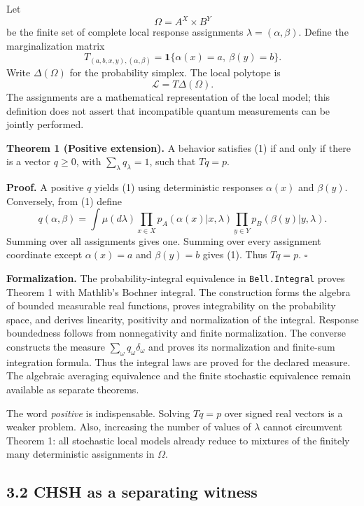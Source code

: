 \documentclass[
]{article}
\begin{document}
Let
\[
\Omega=A^X\times B^Y
\]
be the finite set of complete local response assignments \(\lambda=(\alpha,\beta)\). Define the marginalization matrix
\[
T_{(a,b,x,y),(\alpha,\beta)}
=\mathbf1\{\alpha(x)=a,\ \beta(y)=b\}.
\]
Write \(\Delta(\Omega)\) for the probability simplex. The local polytope is
\[
\mathcal L=T\Delta(\Omega).
\tag{2}
\]
The assignments are a mathematical representation of the local model; this definition does not assert that incompatible quantum measurements can be jointly performed.

\textbf{Theorem 1 (Positive extension).} A behavior satisfies (1) if and only if there is a vector \(q\ge0\), with \(\sum_\lambda q_\lambda=1\), such that \(Tq=p\).

\textbf{Proof.} A positive \(q\) yields (1) using deterministic responses \(\alpha(x)\) and \(\beta(y)\). Conversely, from (1) define
\[
q(\alpha,\beta)=\int\mu(d\lambda)
\prod_{x\in X}p_A(\alpha(x)|x,\lambda)
\prod_{y\in Y}p_B(\beta(y)|y,\lambda).
\]
Summing over all assignments gives one. Summing over every assignment coordinate except \(\alpha(x)=a\) and \(\beta(y)=b\) gives (1). Thus \(Tq=p\). \(\square\)

\textbf{Formalization.} The probability-integral equivalence in \texttt{Bell.Integral} proves Theorem 1 with Mathlib's Bochner integral. The construction forms the algebra of bounded measurable real functions, proves integrability on the probability space, and derives linearity, positivity and normalization of the integral. Response boundedness follows from nonnegativity and finite normalization. The converse constructs the measure \(\sum_\omega q_\omega\delta_\omega\) and proves its normalization and finite-sum integration formula. Thus the integral laws are proved for the declared measure. The algebraic averaging equivalence and the finite stochastic equivalence remain available as separate theorems.

The word \emph{positive} is indispensable. Solving \(Tq=p\) over signed real vectors is a weaker problem. Also, increasing the number of values of \(\lambda\) cannot circumvent Theorem 1: all stochastic local models already reduce to mixtures of the finitely many deterministic assignments in \(\Omega\).

\subsection{3.2 CHSH as a separating witness}\label{chsh-as-a-separating-witness}
\end{document}
